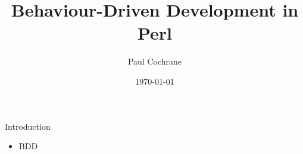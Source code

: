 \documentclass[10pt]{vcs_beamer}
\begin{document}
\author{Paul Cochrane}
\title{Behaviour-Driven Development in Perl}
\date{\today}

\maketitle

\begin{frame}
\begin{multicols}{2}
\begin{spacing}{0.8}
\tableofcontents
\end{spacing}
\end{multicols}
\end{frame}


\begin{frame}{Introduction}

\begin{itemize}
    \item BDD
\end{itemize}

\end{frame}
\end{document}
